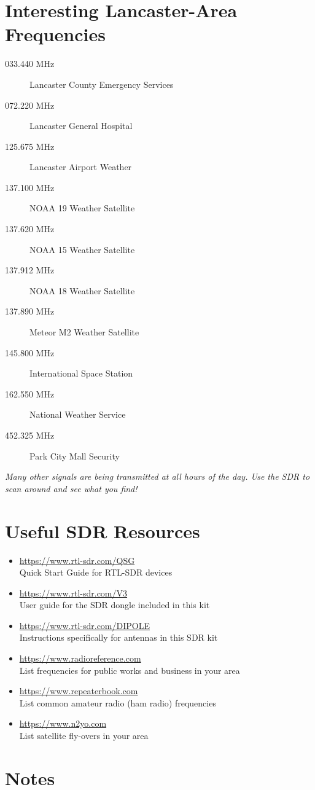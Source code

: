 \documentclass[10pt,foldmark,notumble]{leaflet}
\begin{document}
\section{Interesting Lancaster-Area Frequencies\color{red}\hrulefill\color{black}}
\begin{description}
\item[033.440 MHz] \dotfill Lancaster County Emergency Services
\item[072.220 MHz] \dotfill Lancaster General Hospital
\item[125.675 MHz] \dotfill Lancaster Airport Weather
\item[137.100 MHz] \dotfill NOAA 19 Weather Satellite
\item[137.620 MHz] \dotfill NOAA 15 Weather Satellite
\item[137.912 MHz] \dotfill NOAA 18 Weather Satellite
\item[137.890 MHz] \dotfill Meteor M2 Weather Satellite
\item[145.800 MHz] \dotfill International Space Station
\item[162.550 MHz] \dotfill National Weather Service
\item[452.325 MHz] \dotfill Park City Mall Security
\end{description}

\emph{Many other signals are being transmitted at all hours of the day. Use the
SDR to scan around and see what you find!}

\section{Useful SDR Resources\color{red}\hrulefill\color{black}}
\begin{itemize}
\item \url{https://www.rtl-sdr.com/QSG}\\{\scriptsize Quick Start Guide for RTL-SDR devices}
\item \url{https://www.rtl-sdr.com/V3}\\{\scriptsize User guide for the SDR dongle included in this kit}
\item \url{https://www.rtl-sdr.com/DIPOLE}\\{\scriptsize Instructions specifically for antennas in this SDR kit}
\item \url{https://www.radioreference.com}\\{\scriptsize List frequencies for public works and business in your area}
\item \url{https://www.repeaterbook.com}\\{\scriptsize List common amateur radio (ham radio) frequencies}
\item \url{https://www.n2yo.com}\\{\scriptsize List satellite fly-overs in your area}
\end{itemize}

\section{Notes\color{red}\hrulefill\color{black}}
\end{document}
